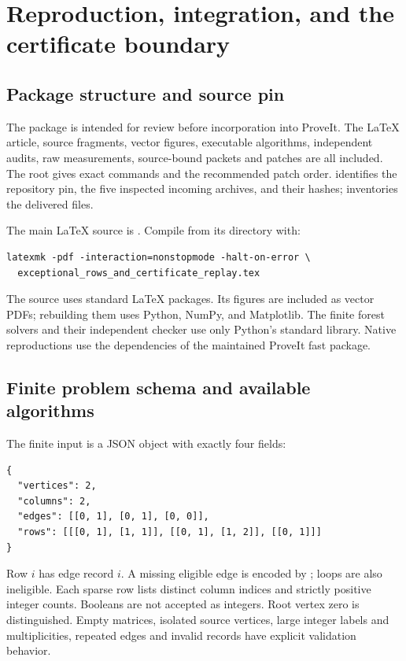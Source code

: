 \section{Reproduction, integration, and the certificate boundary}
\label{sec:reproducibility}

\subsection{Package structure and source pin}

The package is intended for review before incorporation into ProveIt.
The LaTeX article, source fragments, vector figures, executable algorithms,
independent audits, raw measurements, source-bound packets and patches
are all included.  The root  gives exact commands and
the recommended patch order.   identifies the
repository pin, the five inspected incoming archives, and their hashes;
 inventories the delivered files.

The main LaTeX source is
.
Compile from its directory with:
\begin{lstlisting}
latexmk -pdf -interaction=nonstopmode -halt-on-error \
  exceptional_rows_and_certificate_replay.tex
\end{lstlisting}
The source uses standard LaTeX packages.  Its figures are included as
vector PDFs; rebuilding them uses Python, NumPy, and Matplotlib.  The
finite forest solvers and their independent checker use only Python's
standard library.  Native reproductions use the dependencies of the
maintained ProveIt fast package.

\subsection{Finite problem schema and available algorithms}

The finite input is a JSON object with exactly four fields:
\begin{lstlisting}
{
  "vertices": 2,
  "columns": 2,
  "edges": [[0, 1], [0, 1], [0, 0]],
  "rows": [[[0, 1], [1, 1]], [[0, 1], [1, 2]], [[0, 1]]]
}
\end{lstlisting}
Row $i$ has edge record $i$.  A missing eligible edge is encoded by
\code{null}; loops are also ineligible.  Each sparse row lists distinct
column indices and strictly positive integer counts.  Booleans are not
accepted as integers.  Root vertex zero is distinguished.  Empty matrices,
isolated source vertices, large integer labels and multiplicities, repeated
edges and invalid records have explicit validation behavior.

